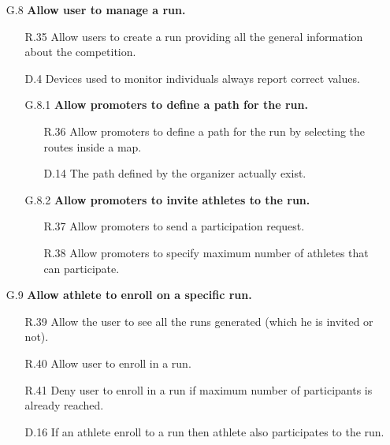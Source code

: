 \begin{enumerate}
\begin{enumerate}
	\item [G.8] \textbf{Allow user to manage a run.}
		\begin{enumerate}
		\item [R.35] Allow users to create a run providing all the general information about the competition.
		\item [D.4] Devices used to monitor individuals always report correct values.
			
		\item [G.8.1] \textbf{Allow promoters to define a path for the run.}
			\begin{enumerate}
			\item [R.36] Allow promoters to define a path for the run by selecting the routes inside a map.
			\item [D.14] The path defined by the organizer actually exist.
			\end{enumerate}
			
		\item [G.8.2] \textbf{Allow promoters to invite athletes to the run.}
			\begin{enumerate}
			\item [R.37] Allow promoters to send a participation request.
			\item [R.38] Allow promoters to specify maximum number of athletes that can participate.
			\end{enumerate}
	\end{enumerate}
	
	\item [G.9] \textbf{Allow athlete to enroll on a specific run.}
		\begin{enumerate}
		\item [R.39] Allow the user to see all the runs generated (which he is invited or not).
		\item [R.40] Allow user to enroll in a run.
		\item [R.41] Deny user to enroll in a run if maximum number of participants is already reached.
		\item [D.16] If an athlete enroll to a run then athlete also participates to the run.
		\end{enumerate}
	

\end{enumerate}
\end{enumerate}
